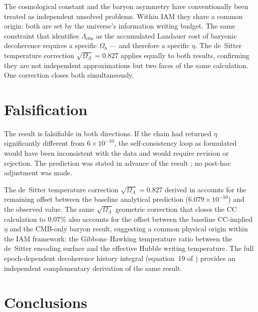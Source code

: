 \documentclass[12pt,a4paper]{article}
\begin{document}
The cosmological constant and the baryon asymmetry have
conventionally been treated as independent unsolved problems.
Within IAM they share a common origin: both are set by the
universe's information writing budget. The same constraint that
identifies $\Lambda_\mathrm{obs}$ as the accumulated Landauer
cost of baryonic decoherence \citep{mahaffey2026_cc} requires
a specific $\Omega_b$ — and therefore a specific $\eta$.
The de~Sitter temperature correction $\sqrt{\Omega_\Lambda} = 0.827$
\citep{mahaffey2026_cc} applies equally to both results,
confirming they are not independent approximations but two faces
of the same calculation. One correction closes both simultaneously.

\section{Falsification}
\label{sec:falsification}

The result is falsifiable in both directions. If the chain had
returned $\eta$ significantly different from $6 \times 10^{-10}$,
the self-consistency loop as formulated would have been
inconsistent with the data and would require revision or rejection.
The prediction was stated in advance of the result
\citep{mahaffey2026_baryon}; no post-hoc adjustment was made.

The de~Sitter temperature correction $\sqrt{\Omega_\Lambda} = 0.827$
derived in \citet{mahaffey2026_cc} accounts for the remaining offset
between the baseline analytical prediction ($6.079 \times 10^{-10}$)
and the observed value. The same $\sqrt{\Omega_\Lambda}$ geometric
correction that closes the CC calculation to $0.07\%$ also accounts
for the offset between the baseline CC-implied $\eta$ and the
CMB-only baryon result, suggesting a common physical origin within
the IAM framework: the Gibbons--Hawking temperature ratio between
the de~Sitter encoding surface and the effective Hubble writing
temperature. The full epoch-dependent decoherence history integral
(equation~19 of \citealt{mahaffey2026_cc}) provides an independent
complementary derivation of the same result.

\section{Conclusions}
\label{sec:conclusions}
\end{document}
